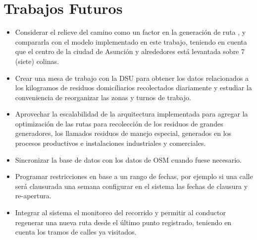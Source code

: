 \section {Trabajos Futuros}

\begin{itemize}
    \item Considerar el relieve del camino como un factor en la generación de ruta \cite{Sulemana2018OptimalMethods}, y compararla con el modelo implementado en este trabajo, teniendo en cuenta que el centro de la ciudad de Asunción y alrededores está levantada sobre 7 (siete) colinas.
    \item Crear una mesa de trabajo con la DSU para obtener los datos relacionados a los kilogramos de residuos domiciliarios recolectados diariamente y estudiar la conveniencia de reorganizar las zonas y turnos de trabajo.
    \item Aprovechar la escalabilidad de la arquitectura implementada para agregar la optimización de las rutas para recolección de los residuos de grandes generadores, los llamados residuos de manejo especial, generados en los procesos productivos e instalaciones industriales y comerciales.
    \item Sincronizar la base de datos con los datos de OSM cuando fuese necesario.
    \item Programar restricciones en base a un rango de fechas, por ejemplo si una calle será clausurada una semana configurar en el sistema las fechas de clausura y re-apertura.
    \item Integrar al sistema el monitoreo del recorrido y permitir al conductor regenerar una nueva ruta desde el último punto registrado, teniendo en cuenta los tramos de calles ya visitados.
\end{itemize}



